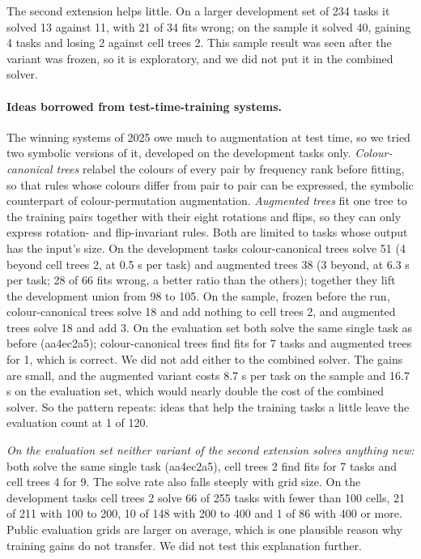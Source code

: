 \documentclass[sigconf,nonacm]{acmart}
\begin{document}
The second extension helps little. On a larger development set of 234 tasks it solved 13 against 11, with 21 of 34 fits wrong; on the sample it solved 40, gaining 4 tasks and losing 2 against cell trees 2. This sample result was seen after the variant was frozen, so it is exploratory, and we did not put it in the combined solver.

\paragraph{Ideas borrowed from test-time-training systems.} The winning systems of 2025 owe much to augmentation at test time, so we tried two symbolic versions of it, developed on the development tasks only. \emph{Colour-canonical trees} relabel the colours of every pair by frequency rank before fitting, so that rules whose colours differ from pair to pair can be expressed, the symbolic counterpart of colour-permutation augmentation. \emph{Augmented trees} fit one tree to the training pairs together with their eight rotations and flips, so they can only express rotation- and flip-invariant rules. Both are limited to tasks whose output has the input's size. On the development tasks colour-canonical trees solve 51 (4 beyond cell trees 2, at 0.5 s per task) and augmented trees 38 (3 beyond, at 6.3 s per task; 28 of 66 fits wrong, a better ratio than the others); together they lift the development union from 98 to 105. On the sample, frozen before the run, colour-canonical trees solve 18 and add nothing to cell trees 2, and augmented trees solve 18 and add 3. On the evaluation set both solve the same single task as before (aa4ec2a5); colour-canonical trees find fits for 7 tasks and augmented trees for 1, which is correct. We did not add either to the combined solver. The gains are small, and the augmented variant costs 8.7 s per task on the sample and 16.7 s on the evaluation set, which would nearly double the cost of the combined solver. So the pattern repeats: ideas that help the training tasks a little leave the evaluation count at 1 of 120.

\emph{On the evaluation set neither variant of the second extension solves anything new:} both solve the same single task (aa4ec2a5), cell trees 2 find fits for 7 tasks and cell trees 4 for 9. The solve rate also falls steeply with grid size. On the development tasks cell trees 2 solve 66 of 255 tasks with fewer than 100 cells, 21 of 211 with 100 to 200, 10 of 148 with 200 to 400 and 1 of 86 with 400 or more. Public evaluation grids are larger on average, which is one plausible reason why training gains do not transfer. We did not test this explanation further.
\end{document}
